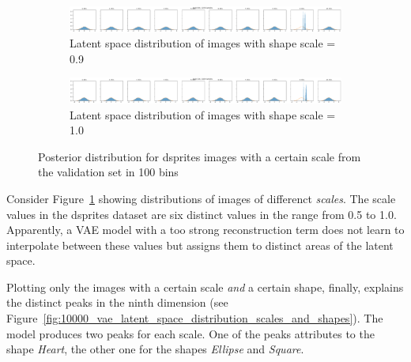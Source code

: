 \begin{figure}
    \begin{subfigure}{\textwidth}
        \centering
        \includegraphics[width=\textwidth]{images/latent_space_entanglement/vae_dsprites_lf_10000_dist_scale_0_9.png}
        \caption{Latent space distribution of images with shape scale = 0.9}
    \end{subfigure}
    \begin{subfigure}{\textwidth}
        \centering
        \includegraphics[width=\textwidth]{images/latent_space_entanglement/vae_dsprites_lf_10000_dist_scale_1_0.png}
        \caption{Latent space distribution of images with shape scale = 1.0}
    \end{subfigure}
    \caption[VAE Latent Space Distribution - dsprites Scales]{Posterior distribution for dsprites images with a certain scale from the validation set in 100 bins}
    \label{fig:10000_vae_latent_space_distribution_scales}
\end{figure}

Consider Figure~\ref{fig:10000_vae_latent_space_distribution_scales} showing distributions of images of differenct \textit{scales}.
The scale values in the dsprites dataset are six distinct values in the range from 0.5 to 1.0.
Apparently, a \ac{VAE} model with a too strong reconstruction term does not learn to interpolate between these values but assigns them to distinct areas of the latent space.

Plotting only the images with a certain scale \textit{and} a certain shape, finally, explains the distinct peaks in the ninth dimension (see Figure~\ref{fig:10000_vae_latent_space_distribution_scales_and_shapes}).
The model produces two peaks for each scale.
One of the peaks attributes to the shape \textit{Heart}, the other one for the shapes \textit{Ellipse} and \textit{Square}.

